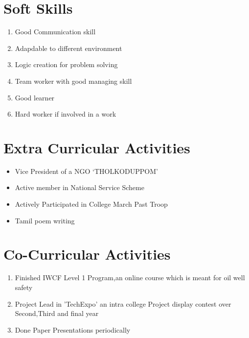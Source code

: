 \documentclass[a4paper,12pt,line]{article}
\begin{document}
	
	\section*{{\color{magenta}Soft Skills}}
	\begin{enumerate}
		\item Good Communication skill
		\item Adapdable to different environment
		\item Logic creation for problem solving
		\item Team worker with good managing skill
		\item Good learner
		\item Hard worker if involved in a work
	\end{enumerate}
	\vspace*{4.2cm}
	\newpage
	
	
	\hspace*{-19mm}
	\section*{{\color{magenta}Extra Curricular Activities}}
	\begin{itemize}
		\item Vice President of a NGO ‘THOLKODUPPOM’
		\item Active member in National Service Scheme
		\item Actively Participated in College March Past Troop
		\item Tamil poem writing
	\end{itemize}


	\section*{{\color{magenta}Co-Curricular Activities}}
	\begin{enumerate}
		\item Finished IWCF Level 1 Program,an online course which is meant for oil well safety
		\item Project Lead in 'TechExpo' an intra college Project display contest over Second,Third and final year
		\item Done Paper Presentations periodically
	\end{enumerate}
\end{document}
